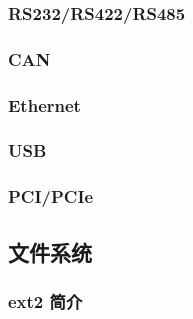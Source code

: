 \subsubsection{RS232/RS422/RS485}

\subsubsection{CAN}

\subsubsection{Ethernet}

\subsubsection{USB}

\subsubsection{PCI/PCIe}

\subsection{文件系统}

\subsubsection{ext2 简介}
